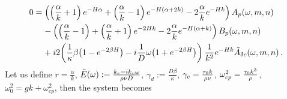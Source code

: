 \documentclass[reqno]{amsart}
\numberwithin{equation}{section}
\numberwithin{figure}{section}
\begin{document}
\begin{align*}
0
  &= \left(\left(\frac{\alpha}{k}+1\right)e^{-H\alpha}+\left(\frac{\alpha}{k}-1\right)e^{-H\left(\alpha+2k\right)}-2\frac{\alpha}{k}e^{-H k}\right)A_{p}\!\left(\omega,m,n\right) \\
  &\phantom{=}\,\,-\left(\left(\frac{\alpha}{k}-1\right)+\left(\frac{\alpha}{k}+1\right)e^{-2H k}-2\frac{\alpha}{k}e^{-H\left(\alpha+k\right)}\right)B_{p}\!\left(\omega,m,n\right) \\
  &\phantom{=}\,\,+i2\!\left(\frac{1}{\kappa}\beta\!\left(1-e^{-2\beta H}\right)-i\frac{1}{D}\omega\!\left(1+e^{-2\beta H}\right)\right)\frac{1}{k^{2}}e^{-H k}\tilde{A}_{\delta c}\!\left(\omega,m,n\right).
\end{align*}
Let us define $r=\frac{\alpha}{k}$, $\tilde{E}\!\left(\omega\right):=\frac{k_{e}-ik_{v}\omega}{\rho\nu D}$, $\gamma_{d}:=\frac{D\beta}{\kappa}$, $\gamma_{c}=\frac{\tau_{0}k}{\rho\nu}$, $\omega_{cp}^{2}=\frac{\tau_{0}k^{3}}{\rho}$, $\omega_{0}^{2}=gk+\omega_{cp}^{2}$, then the system becomes
\end{document}

